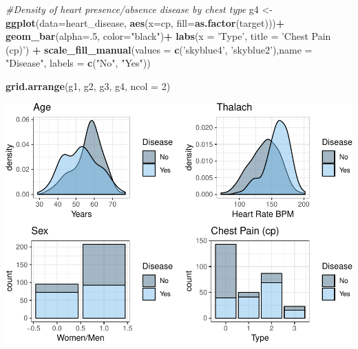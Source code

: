 \documentclass[]{article}
\newenvironment{Shaded}{\begin{snugshade}}{\end{snugshade}}
\newcommand{\KeywordTok}[1]{\textcolor[rgb]{0.13,0.29,0.53}{\textbf{#1}}}
\newcommand{\DataTypeTok}[1]{\textcolor[rgb]{0.13,0.29,0.53}{#1}}
\newcommand{\DecValTok}[1]{\textcolor[rgb]{0.00,0.00,0.81}{#1}}
\newcommand{\StringTok}[1]{\textcolor[rgb]{0.31,0.60,0.02}{#1}}
\newcommand{\CommentTok}[1]{\textcolor[rgb]{0.56,0.35,0.01}{\textit{#1}}}
\newcommand{\OperatorTok}[1]{\textcolor[rgb]{0.81,0.36,0.00}{\textbf{#1}}}
\newcommand{\NormalTok}[1]{#1}
\begin{document}
\begin{Shaded}
\begin{Highlighting}[]
\CommentTok{#Density of heart presence/absence disease by chest type}
\NormalTok{g4 <-}\StringTok{ }\KeywordTok{ggplot}\NormalTok{(}\DataTypeTok{data=}\NormalTok{heart_disease, }\KeywordTok{aes}\NormalTok{(}\DataTypeTok{x=}\NormalTok{cp, }\DataTypeTok{fill=}\KeywordTok{as.factor}\NormalTok{(target)))}\OperatorTok{+}
\StringTok{  }\KeywordTok{geom_bar}\NormalTok{(}\DataTypeTok{alpha=}\NormalTok{.}\DecValTok{5}\NormalTok{, }\DataTypeTok{color=}\StringTok{"black"}\NormalTok{)}\OperatorTok{+}
\StringTok{  }\KeywordTok{labs}\NormalTok{(}\DataTypeTok{x =} \StringTok{'Type'}\NormalTok{, }\DataTypeTok{title =} \StringTok{'Chest Pain (cp)'}\NormalTok{) }\OperatorTok{+}
\StringTok{  }\KeywordTok{scale_fill_manual}\NormalTok{(}\DataTypeTok{values =} \KeywordTok{c}\NormalTok{(}\StringTok{'skyblue4'}\NormalTok{, }\StringTok{'skyblue2'}\NormalTok{),}\DataTypeTok{name =} \StringTok{"Disease"}\NormalTok{, }\DataTypeTok{labels =} \KeywordTok{c}\NormalTok{(}\StringTok{"No"}\NormalTok{, }\StringTok{"Yes"}\NormalTok{))}

\KeywordTok{grid.arrange}\NormalTok{(g1, g2, g3, g4, }\DataTypeTok{ncol =} \DecValTok{2}\NormalTok{)}
\end{Highlighting}
\end{Shaded}

\includegraphics{project_report_files/figure-latex/unnamed-chunk-6-1.pdf}
\end{document}
